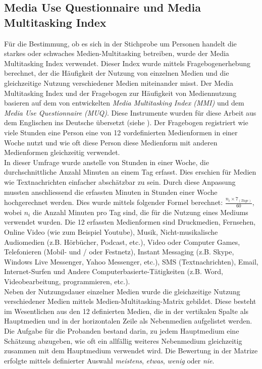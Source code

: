 \subsection{Media Use Questionnaire und Media Multitasking Index}\label{subsection.muq}
Für die Bestimmung, ob es sich in der Stichprobe um Personen handelt die starkes oder schwaches Medien-Multitasking betreiben, wurde der Media Multitasking Index verwendet. Dieser Index wurde mittels Fragebogenerhebung berechnet, der die Häufigkeit der Nutzung von einzelnen Medien und die gleichzeitige Nutzung verschiedener Medien miteinander misst. Der Media Multitasking Index und der Fragebogen zur Häufigkeit von Mediennutzung basieren auf dem von  entwickelten \textit{Media Multitasking Index (MMI)} und dem \textit{Media Use Questionnaire (MUQ)}. Diese Instrumente wurden für diese Arbeit aus dem Englischen ins Deutsche übersetzt (siehe ). Der Fragebogen registriert wie viele Stunden eine Person eine von 12 vordefinierten Medienformen in einer Woche nutzt und wie oft diese Person diese Medienform mit anderen Medienformen gleichzeitig verwendet. \\ 
In dieser Umfrage wurde anstelle von Stunden in einer Woche, die durchschnittliche Anzahl Minuten an einem Tag erfasst. Dies erschien für Medien wie Textnachrichten einfacher abschätzbar zu sein. Durch diese Anpassung mussten anschliessend die erfassten Minuten in Stunden einer Woche hochgerechnet werden. Dies wurde mittels folgender Formel berechnet: \(\frac{n_{i} \times 7_{(Tage)}}{60}\), wobei \(n_{i}\) die Anzahl Minuten pro Tag sind, die für die Nutzung eines Mediums verwendet wurden. Die 12 erfassten Medienformen sind Druckmedien, Fernsehen, Online Video (wie zum Beispiel Youtube), Musik, Nicht-musikalische Audiomedien (z.B. Hörbücher, Podcast, etc.), Video oder Computer Games, Telefonieren (Mobil- und / oder Festnetz), Instant Messaging (z.B. Skype, Windows Live Messenger, Yahoo Messenger, etc.), SMS (Textnachrichten), Email, Internet-Surfen und Andere Computerbasierte-Tätigkeiten (z.B. Word, Videobearbeitung, programmieren, etc.). \\
Neben der Nutzungsdauer einzelner Medien wurde die gleichzeitige Nutzung verschiedener Medien mittels Medien-Multitasking-Matrix gebildet. Diese besteht im Wesentlichen aus den 12 definierten Medien, die in der vertikalen Spalte als Hauptmedien und in der horizontalen Zeile als Nebenmedien aufgelistet werden. Die Aufgabe für die Probanden bestand darin, zu jedem Hauptmedium eine Schätzung abzugeben, wie oft ein allfällig weiteres Nebenmedium gleichzeitig zusammen mit dem Hauptmedium verwendet wird. Die Bewertung in der Matrize erfolgte mittels definierter Auswahl \textit{meistens}, \textit{etwas}, \textit{wenig} oder \textit{nie}.\\
